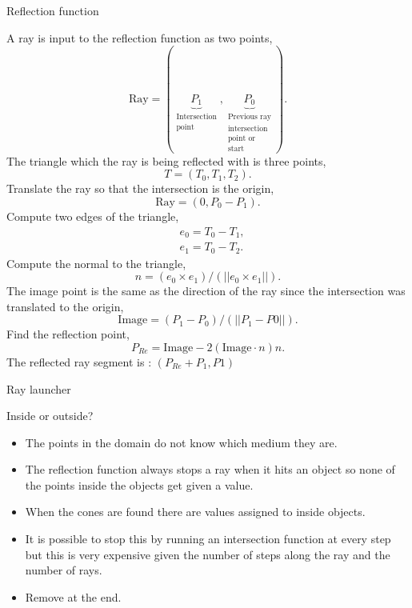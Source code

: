 \documentclass[8pt]{beamer}
\begin{document}
\begin{frame}{Reflection function}
\begin{block}{}
\begin{multicols}{2}
A ray is input to the reflection function as two points,
\begin{equation*}
\text{Ray}=(\underbrace{P_1}_{\substack{\text{Intersection}\\ \text{point}}},\underbrace{P_0}_{\substack{\text{Previous ray}\\  \text{intersection} \\ \text{point or} \\ \text{start}}}).
\end{equation*}
The triangle which the ray is being reflected with is three points,
\begin{equation*}
T=(T_0,T_1,T_2).
\end{equation*}
Translate the ray so that the intersection is the origin,
\begin{equation*}
\text{Ray}=(0,P_0-P_1).
\end{equation*}
Compute two edges of the triangle,
\begin{align*}
& e_0=T_0-T_1, \\
& e_1=T_0-T_2.
\end{align*}
Compute the normal to the triangle,
\begin{equation*}
n=(e_0 \times e_1)/ (||e_0 \times e_1||).
\end{equation*}
The image point is the same as the direction of the ray since the intersection was translated to the origin,
\begin{equation}
\text{Image}=(P_1-P_0)/(||P_1-P0||).
\end{equation}
Find the reflection point,
\begin{equation}
P_{Re}=\text{Image}-2(\text{Image} \cdot n) n.
\end{equation}
The reflected ray segment is : $(P_{Re}+P_1,P1)$
\end{multicols}
\end{block}
\end{frame}
\begin{frame}{Ray launcher}
\begin{block}{Inside or outside?}
\begin{itemize}
\item The points in the domain do not know which medium they are.
\item The reflection function always stops a ray when it hits an object so none of the points inside the objects get given a value.
\item When the cones are found there are values assigned to inside objects.
\item It is possible to stop this by running an intersection function at every step but this is very expensive given the number of steps along the ray and the number of rays.
\item Remove at the end.
\end{itemize}
\end{block}
\end{frame}
\end{document}
